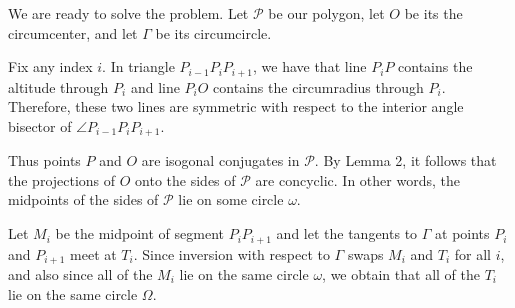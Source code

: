 We are ready to solve the problem.
Let $\mathcal{P}$ be our polygon,
let $O$ be its the circumcenter,
and let $\Gamma$ be its circumcircle.

Fix any index $i$. In triangle $P_{i - 1}P_iP_{i + 1}$,
we have that line $P_iP$ contains the altitude through $P_i$
and line $P_iO$ contains the circumradius through $P_i$.
Therefore, these two lines are symmetric with respect
to the interior angle bisector of $\angle P_{i - 1}P_iP_{i + 1}$.

Thus points $P$ and $O$ are isogonal conjugates in $\mathcal{P}$.
By Lemma 2, it follows that the projections of $O$
onto the sides of $\mathcal{P}$ are concyclic.
In other words, the midpoints of the sides of
$\mathcal{P}$ lie on some circle $\omega$.

Let $M_i$ be the midpoint of segment $P_iP_{i + 1}$
and let the tangents to $\Gamma$ at points $P_i$ and $P_{i + 1}$ meet at $T_i$.
Since inversion with respect to $\Gamma$ swaps $M_i$ and $T_i$ for all $i$,
and also since all of the $M_i$ lie on the same circle $\omega$,
we obtain that all of the $T_i$ lie on the same circle $\Omega$.

